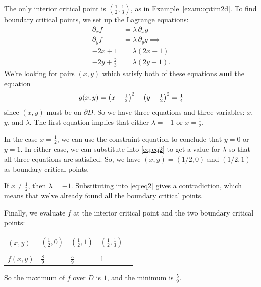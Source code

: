 \documentclass{watsonbook}
\begin{document}
  \begin{solution}
    The only interior critical point is
    $\left(\tfrac{1}{2},\tfrac{1}{3}\right)$, as in
    Example~\ref{exam:optim2d}. To find boundary critical points, we
    set up the Lagrange equations:
    \begin{align} \nonumber
      \partial_x f &= \lambda \, \partial_x g \\ \nonumber
      \partial_y f &= \lambda \, \partial_y g \implies \\ 
      -2x + 1 &= \lambda(2x - 1)  \\ \label{eq:eq2}
      -2y + \tfrac{2}{3} &= \lambda(2y-1). 
    \end{align}
    We're looking for pairs $(x,y)$ which satisfy both of these
    equations \textbf{and} the equation
    \begin{equation} 
          g(x,y) = \left(x-\tfrac{1}{2}\right)^2 +
          \left(y-\tfrac{1}{2}\right)^2 = \tfrac{1}{4} \\ 
    \end{equation}
    since
    $(x,y)$ must be on $\partial D$. So we have three equations and three
    variables: $x$, $y$, and $\lambda$. The first equation implies
    that either $\lambda = -1$ or $x = \tfrac{1}{2}$.

    In the case $x = \frac{1}{2}$, we can use the constraint equation
    to conclude that $y = 0$ or $y = 1$. In either case, we can
    substitute into \eqref{eq:eq2} to get a value for $\lambda$ so
    that all three equations are satisfied. So, we have
    $(x,y) = (1/2, 0)$ and $(1/2,1)$ as boundary critical points.

    If $x \neq \tfrac{1}{2}$, then $\lambda = -1$. Substituting into
    \eqref{eq:eq2} gives a contradiction, which means that we've
    already found all the boundary critical points.

    Finally, we evaluate $f$ at the interior critical point and the
    two boundary critical points: \vspace{-12pt}
    \begin{center}
      \begin{tabular}{M{1.2cm}|M{1.2cm}M{1.2cm}M{2cm}N}
        $(x,y)$ & $\left(\frac{1}{2}, 0\right)$  & $\left(\frac{1}{2},
                                1\right)$ &
                                            $\left(\frac{1}{2},
                                            \frac{1}{3} \right)$ &
        \\[12pt] \hline  \\[-8pt] 
        $f(x,y)$ & $\frac{8}{9}$ & $\frac{5}{9}$ & 1 &  \\
      \end{tabular}
    \end{center}
    So the maximum of $f$ over $D$ is $1$, and the minimum is
    $\frac{5}{9}$. 
  \end{solution}
\end{document}
